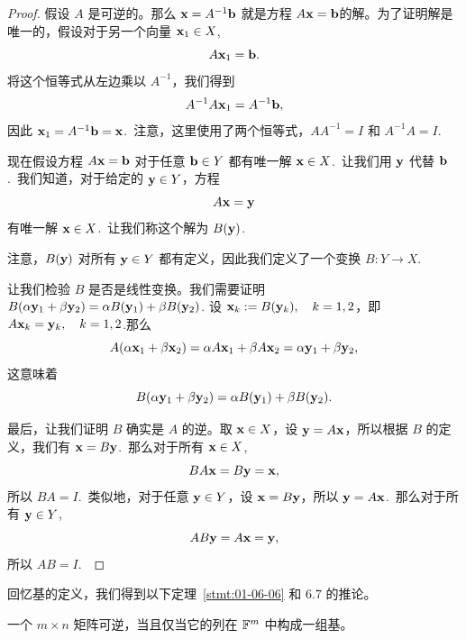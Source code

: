 \begin{proof} 假设 $A$ 是可逆的。那么 $\mathbf{x} = A^{-1} \mathbf{b}$ 就是方程 $A \mathbf{x} = \mathbf{b}$的解。为了证明解是唯一的，假设对于另一个向量 $\mathbf{x}_1 \in X$,
$$A \mathbf{x}_1 = \mathbf{b}.$$
将这个恒等式从左边乘以 $A^{-1}$，我们得到 $$A^{-1} A \mathbf{x}_1 = A^{-1} \mathbf{b},$$
因此 $\mathbf{x}_1 = A^{-1} \mathbf{b} = \mathbf{x}$.~注意，这里使用了两个恒等式，$AA^{-1} = I$ 和 $A^{-1} A = I$.~

现在假设方程 $A \mathbf{x} = \mathbf{b}$ 对于任意 $\mathbf{b} \in Y$ 都有唯一解 $\mathbf{x} \in X$.~让我们用 $\mathbf{y}$ 代替 $\mathbf{b}$.~我们知道，对于给定的 $\mathbf{y} \in Y$，方程
$$A \mathbf{x} = \mathbf{y}$$
有唯一解 $\mathbf{x} \in X$.~让我们称这个解为 $B(\mathbf{y})$.~

注意，$B(\mathbf{y})$ 对所有 $\mathbf{y} \in Y$ 都有定义，因此我们定义了一个变换 $B: Y \to X$.~

让我们检验 $B$ 是否是线性变换。我们需要证明 $B(\alpha \mathbf{y}_1 + \beta \mathbf{y}_2) = \alpha B(\mathbf{y}_1) + \beta B(\mathbf{y}_2)$.
设 $\mathbf{x}_k := B(\mathbf{y}_k),\quad k = 1, 2$，即
$A \mathbf{x}_k = \mathbf{y}_k,\quad k = 1, 2$.那么
$$A(\alpha \mathbf{x}_1 + \beta \mathbf{x}_2) = \alpha A \mathbf{x}_1 + \beta A \mathbf{x}_2 = \alpha \mathbf{y}_1 + \beta \mathbf{y}_2,$$
这意味着
$$B(\alpha \mathbf{y}_1 + \beta \mathbf{y}_2) = \alpha B(\mathbf{y}_1) + \beta B(\mathbf{y}_2).$$

最后，让我们证明 $B$ 确实是 $A$ 的逆。取 $\mathbf{x} \in X$，设 $\mathbf{y} = A \mathbf{x}$，所以根据 $B$ 的定义，我们有 $\mathbf{x} = B \mathbf{y}$.~那么对于所有 $\mathbf{x} \in X$,
$$BA \mathbf{x} = B \mathbf{y} = \mathbf{x},$$
所以 $BA = I$.~类似地，对于任意 $\mathbf{y} \in Y$，设 $\mathbf{x} = B \mathbf{y}$，所以 $\mathbf{y} = A \mathbf{x}$.~那么对于所有 $\mathbf{y} \in Y$,
$$AB \mathbf{y} = A \mathbf{x} = \mathbf{y},$$
所以 $AB = I$.~\end{proof}

回忆基的定义，我们得到以下定理~\ref{stmt:01-06-06} 和 6.7 的推论。

\begin{corollary}\label{stmt:01-06-09}
一个 $m \times n$ 矩阵可逆，当且仅当它的列在 $\mathbb{F}^m$ 中构成一组基。
\end{corollary}

